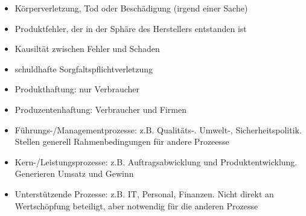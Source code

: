 \documentclass[12pt]{article}
\begin{document}
\begin{note}

    \begin{field}
        \begin{itemize}
            \item Körperverletzung, Tod oder Beschädigung (irgend einer Sache)

            \item Produktfehler, der in der Sphäre des Herstellers entstanden ist

            \item Kausiltät zwischen Fehler und Schaden

            \item schuldhafte Sorgfaltspflichtverletzung
        \end{itemize}
    \end{field}
\end{note}

\begin{note}

    \begin{field}
        \begin{itemize}
            \item Produkthaftung: nur Verbraucher

            \item Produzentenhaftung: Verbraucher und Firmen
        \end{itemize}
    \end{field}
\end{note}

\begin{note}
\end{note}

\begin{note}

    \begin{field}
        \begin{itemize}
            \item Führungs-/Managementprozesse: z.B. Qualitäts-. Umwelt-, Sicherheitspolitik. Stellen generell Rahmenbedingungen für andere Prozeesse


            \item Kern-/Leistungsprozesse: z.B. Auftragsabwicklung und Produktentwicklung. Generieren Umsatz und Gewinn

            \item Unterstützende Prozesse: z.B. IT, Personal, Finanzen. Nicht direkt an Wertschöpfung beteiligt, aber notwendig für die anderen Prozesse
        \end{itemize}
    \end{field}
\end{note}
\end{document}
